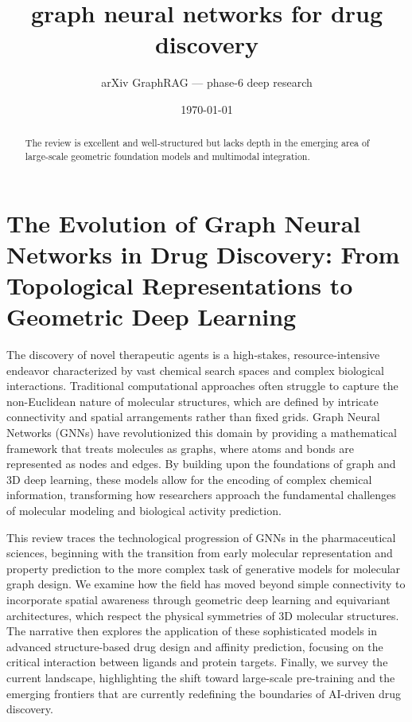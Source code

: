 \documentclass[11pt]{article}
\title{graph neural networks for drug discovery}
\author{arXiv GraphRAG --- phase-6 deep research}
\date{\today}
\begin{document}
\maketitle

\begin{abstract}
The review is excellent and well-structured but lacks depth in the emerging area of large-scale geometric foundation models and multimodal integration.
\end{abstract}

\section{The Evolution of Graph Neural Networks in Drug Discovery: From Topological Representations to Geometric Deep Learning}

The discovery of novel therapeutic agents is a high-stakes, resource-intensive endeavor characterized by vast chemical search spaces and complex biological interactions. Traditional computational approaches often struggle to capture the non-Euclidean nature of molecular structures, which are defined by intricate connectivity and spatial arrangements rather than fixed grids. Graph Neural Networks (GNNs) have revolutionized this domain by providing a mathematical framework that treats molecules as graphs, where atoms and bonds are represented as nodes and edges. By building upon the foundations of graph and 3D deep learning, these models allow for the encoding of complex chemical information, transforming how researchers approach the fundamental challenges of molecular modeling and biological activity prediction.

This review traces the technological progression of GNNs in the pharmaceutical sciences, beginning with the transition from early molecular representation and property prediction to the more complex task of generative models for molecular graph design. We examine how the field has moved beyond simple connectivity to incorporate spatial awareness through geometric deep learning and equivariant architectures, which respect the physical symmetries of 3D molecular structures. The narrative then explores the application of these sophisticated models in advanced structure-based drug design and affinity prediction, focusing on the critical interaction between ligands and protein targets. Finally, we survey the current landscape, highlighting the shift toward large-scale pre-training and the emerging frontiers that are currently redefining the boundaries of AI-driven drug discovery.
\end{document}
